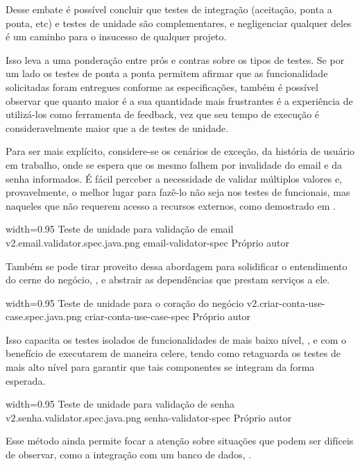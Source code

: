   Desse embate é possível concluir que testes de integração (aceitação, ponta a ponta, etc) e testes de unidade são complementares, e negligenciar qualquer deles é um caminho para o insucesso de qualquer projeto.

  Isso leva a uma ponderação entre prós e contras sobre os tipos de testes. Se por um lado os testes de ponta a ponta permitem afirmar que as funcionalidade solicitadas foram entregues conforme as especificações, também é possível observar que quanto maior é a sua quantidade mais frustrantes é a experiência de utilizá-los como ferramenta de feedback, vez que seu tempo de execução é consideravelmente maior que a de testes de unidade.

  Para ser mais explícito, considere-se os cenários de exceção, da história de usuário em trabalho, onde se espera que os mesmo falhem por invalidade do email e da senha informados. É fácil perceber a necessidade de validar múltiplos valores e, provavelmente, o melhor lugar para fazê-lo não seja nos testes de funcionais, mas naqueles que não requerem acesso a recursos externos, como demostrado em .

  \imagem
    {width=0.95\textwidth}
    {Teste de unidade para validação de email}
    {v2.email.validator.spec.java.png}
    {email-validator-spec}
    {Próprio autor}

  Também se pode tirar proveito dessa abordagem para solidificar o entendimento do cerne do negócio, , e abstrair as dependências que prestam serviços a ele.

  \imagem
    {width=0.95\textwidth}
    {Teste de unidade para o coração do negócio}
    {v2.criar-conta-use-case.spec.java.png}
    {criar-conta-use-case-spec}
    {Próprio autor}

  Isso capacita os testes isolados de funcionalidades de mais baixo nível, , e com o benefício de executarem de maneira celere, tendo como retaguarda os testes de mais alto nível para garantir que tais componentes se integram da forma esperada.

  \imagem
    {width=0.95\textwidth}
    {Teste de unidade para validação de senha}
    {v2.senha.validator.spec.java.png}
    {senha-validator-spec}
    {Próprio autor}

  Esse método ainda permite focar a atenção sobre situações que podem ser difíceis de observar, como a integração com um banco de dados, .

